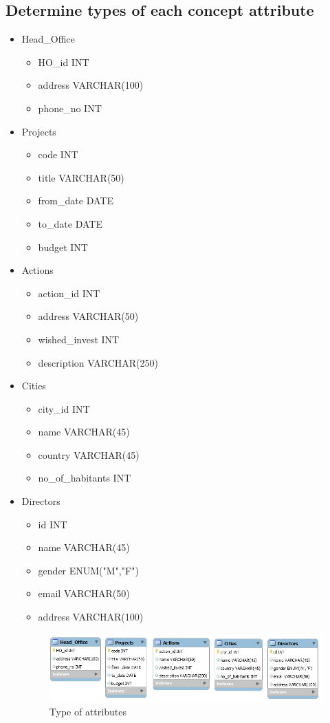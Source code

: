 \documentclass{article}
\begin{document}
\subsection{Determine types of each concept attribute}
\begin{itemize}
	\item Head\_Office
	\begin{itemize}
		\item HO\_id INT
		\item address VARCHAR(100)
		\item phone\_no INT
	\end{itemize}
	\item Projects
		\begin{itemize}
		\item code INT
		\item title VARCHAR(50)
		\item from\_date DATE
		\item to\_date DATE
		\item budget INT
	\end{itemize}
	\item Actions
		\begin{itemize}
		\item action\_id INT
		\item address VARCHAR(50)
		\item wished\_invest INT
		\item description VARCHAR(250)
	\end{itemize}
	\item Cities
		\begin{itemize}
		\item city\_id INT
		\item name VARCHAR(45)
		\item country VARCHAR(45)
		\item no\_of\_habitants INT
	\end{itemize}
	\item Directors
		\begin{itemize}
		\item id INT
		\item name VARCHAR(45)
		\item gender ENUM("M","F")
		\item email VARCHAR(50)
		\item address VARCHAR(100)
	\end{itemize}
\begin{figure}[h]
\centering
\includegraphics[scale = 0.55]{3.PNG}
\caption{Type of attributes}
\end{figure}
\end{itemize}
\end{document}
